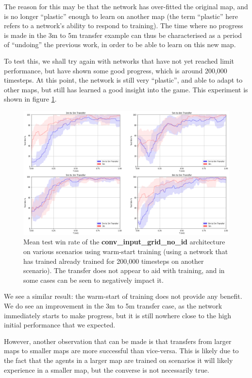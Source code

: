 The reason for this may be that the network has over-fitted the original map, and is no longer ``plastic'' enough to learn on another map (the term ``plastic'' here refers to a network's ability to respond to training). The time where no progress is made in the 3m to 5m transfer example can thus be characterised as a period of ``undoing'' the previous work, in order to be able to learn on this new map.

To test this, we shall try again with networks that have not yet reached limit performance, but have shown some good progress, which is around 200,000 timesteps. At this point, the network is still very ``plastic'', and able to adapt to other maps, but still has learned a good insight into the game. This experiment is shown in figure \ref{fig:transfer2}.


\begin{figure}[h]
    \centering
    \hbox{\hspace{-5em}\includegraphics[width=1.2\textwidth]{images/graphs/2.png}}
    \caption{Mean test win rate of the \textbf{conv\_input\_grid\_no\_id} architecture on various scenarios using warm-start training (using a network that has trained already trained for 200,000 timesteps on another scenario). The transfer does not appear to aid with training, and in some cases can be seen to negatively impact it.}
    \label{fig:transfer2}
\end{figure}

We see a similar result: the warm-start of training does not provide any benefit. We do see an improvement in the 3m to 5m transfer case, as the network immediately starts to make progress, but it is still nowhere close to the high initial performance that we expected.

However, another observation that can be made is that transfers from larger maps to smaller maps are more successful than vice-versa. This is likely due to the fact that the agents in a larger map are trained on scenarios it will likely experience in a smaller map, but the converse is not necessarily true.


